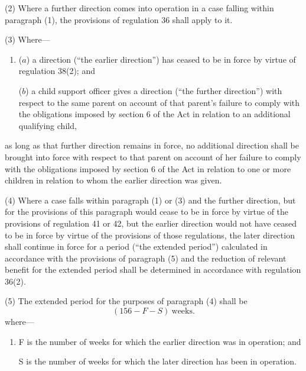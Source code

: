 \documentclass[a4paper]{article}
\begin{document}
(2) Where a further direction comes into operation in a case falling within paragraph (1), the provisions of regulation 36 shall apply to it.


(3) Where—
\begin{enumerate}\item[]
($a$) a direction (“the earlier direction”) has ceased to be in force by virtue of regulation 38(2); and

($b$) a child support officer gives a direction (“the further direction”) with respect to the same parent on account of that parent’s failure to comply with the obligations imposed by section 6 of the Act in relation to an additional qualifying child,
\end{enumerate}
as long as that further direction remains in force, no additional direction shall be brought into force with respect to that parent on account of her failure to comply with the obligations imposed by section 6 of the Act in relation to one or more children in relation to whom the earlier direction was given.

(4) Where a case falls within paragraph (1) or (3) and the further direction, but for the provisions of this paragraph would cease to be in force by virtue of the provisions of regulation 41 or 42, but the earlier direction would not have ceased to be in force by virtue of the provisions of those regulations, the later direction shall continue in force for a period (“the extended period”) calculated in accordance with the provisions of paragraph (5) and the reduction of relevant benefit 
for the extended period shall be determined in accordance with regulation 36(2).  %

(5) The extended period for the purposes of paragraph (4) shall be 
\[(156-F-S) \mathrm{\ weeks.}\]  %
 where—
\begin{enumerate}\item[]
F is the number of weeks for which the earlier direction was in operation; and

S is the number of weeks for which the later direction has been in operation.
\end{enumerate}
\end{document}
